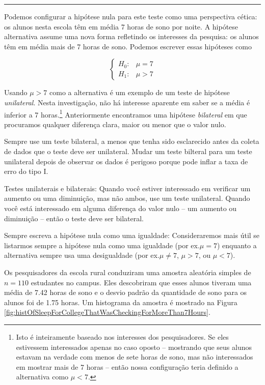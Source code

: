 \documentclass[
]{book}
\theoremstyle{definition}
\theoremstyle{definition}
\theoremstyle{definition}
\theoremstyle{definition}
\theoremstyle{remark}
\begin{document}
\begin{center}\rule{0.5\linewidth}{0.5pt}\end{center}

Podemos configurar a hipótese nula para este teste como uma perspectiva cética: os alunos nesta escola têm em média 7 horas de sono por noite. A hipótese alternativa assume uma nova forma refletindo os interesses da pesquisa: os alunos têm em média mais de 7 horas de sono. Podemos escrever essas hipóteses como

\[
\begin{cases}
  H_0: & \mu = 7 \\
  H_1: & \mu > 7
\end{cases}
\]

Usando \(\mu > 7\) como a alternativa é um exemplo de um teste de hipótese \emph{unilateral}. Nesta investigação, não há interesse aparente em saber se a média é inferior a 7 horas.\footnote{Isto é inteiramente baseado nos interesses dos pesquisadores. Se eles estivessem interessados apenas no caso oposto -- mostrando que seus alunos estavam na verdade com menos de sete horas de sono, mas não interessados em mostrar mais de 7 horas -- então nossa configuração teria definido a alternativa como \(\mu<7\).} Anteriormente encontramos uma hipótese \emph{bilateral} em que procuramos qualquer diferença clara, maior ou menor que o valor nulo.

Sempre use um teste bilateral, a menos que tenha sido esclarecido antes da coleta de dados que o teste deve ser unilateral. Mudar um teste bilteral para um teste unilateral depois de observar os dados é perigoso porque pode inflar a taxa de erro do tipo I.

Testes unilaterais e bilaterais: Quando você estiver interessado em verificar um aumento ou uma diminuição, mas não ambos, use um teste unilateral. Quando você está interessado em alguma diferença do valor nulo -- um aumento ou diminuição -- então o teste deve ser bilateral.

Sempre escreva a hipótese nula como uma igualdade: Consideraremos mais útil se listarmos sempre a hipótese nula como uma igualdade (por ex.\(\mu = 7\)) enquanto a alternativa sempre usa uma desigualdade (por ex.\(\mu\neq7\), \(\mu>7\), ou \(\mu<7\)).

Os pesquisadores da escola rural conduziram uma amostra aleatória simples de \(n = 110\) estudantes no campus. Eles descobriram que esses alunos tiveram uma média de 7.42 horas de sono e o desvio padrão da quantidade de sono para os alunos foi de 1.75 horas. Um histograma da amostra é mostrado na Figura \ref{fig:histOfSleepForCollegeThatWasCheckingForMoreThan7Hours}.
\end{document}
